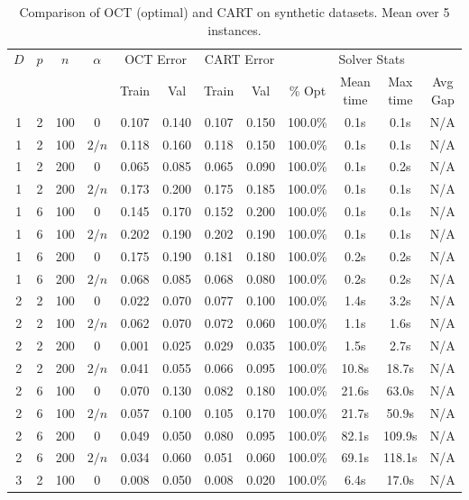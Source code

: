 \begin{table}[h]
\centering
\small
\caption{Comparison of OCT (optimal) and CART on synthetic datasets. Mean over 5 instances.}
\label{tab:results}
\begin{tabular}{cccc|cc|cc|cccc}
\hline
$D$ & $p$ & $n$ & $\alpha$ & \multicolumn{2}{c|}{OCT Error} & \multicolumn{2}{c|}{CART Error} & \multicolumn{4}{c}{Solver Stats} \\
    &     &     &          & Train & Val & Train & Val & \% Opt & Mean time & Max time & Avg Gap \\
\hline
1 & 2 & 100 & $0$ & 0.107 & 0.140 & 0.107 & 0.150 & 100.0\% & 0.1s & 0.1s & N/A \\
1 & 2 & 100 & $2/n$ & 0.118 & 0.160 & 0.118 & 0.150 & 100.0\% & 0.1s & 0.1s & N/A \\
1 & 2 & 200 & $0$ & 0.065 & 0.085 & 0.065 & 0.090 & 100.0\% & 0.1s & 0.2s & N/A \\
1 & 2 & 200 & $2/n$ & 0.173 & 0.200 & 0.175 & 0.185 & 100.0\% & 0.1s & 0.1s & N/A \\
1 & 6 & 100 & $0$ & 0.145 & 0.170 & 0.152 & 0.200 & 100.0\% & 0.1s & 0.1s & N/A \\
1 & 6 & 100 & $2/n$ & 0.202 & 0.190 & 0.202 & 0.190 & 100.0\% & 0.1s & 0.1s & N/A \\
1 & 6 & 200 & $0$ & 0.175 & 0.190 & 0.181 & 0.180 & 100.0\% & 0.2s & 0.2s & N/A \\
1 & 6 & 200 & $2/n$ & 0.068 & 0.085 & 0.068 & 0.080 & 100.0\% & 0.2s & 0.2s & N/A \\
2 & 2 & 100 & $0$ & 0.022 & 0.070 & 0.077 & 0.100 & 100.0\% & 1.4s & 3.2s & N/A \\
2 & 2 & 100 & $2/n$ & 0.062 & 0.070 & 0.072 & 0.060 & 100.0\% & 1.1s & 1.6s & N/A \\
2 & 2 & 200 & $0$ & 0.001 & 0.025 & 0.029 & 0.035 & 100.0\% & 1.5s & 2.7s & N/A \\
2 & 2 & 200 & $2/n$ & 0.041 & 0.055 & 0.066 & 0.095 & 100.0\% & 10.8s & 18.7s & N/A \\
2 & 6 & 100 & $0$ & 0.070 & 0.130 & 0.082 & 0.180 & 100.0\% & 21.6s & 63.0s & N/A \\
2 & 6 & 100 & $2/n$ & 0.057 & 0.100 & 0.105 & 0.170 & 100.0\% & 21.7s & 50.9s & N/A \\
2 & 6 & 200 & $0$ & 0.049 & 0.050 & 0.080 & 0.095 & 100.0\% & 82.1s & 109.9s & N/A \\
2 & 6 & 200 & $2/n$ & 0.034 & 0.060 & 0.051 & 0.060 & 100.0\% & 69.1s & 118.1s & N/A \\
3 & 2 & 100 & $0$ & 0.008 & 0.050 & 0.008 & 0.020 & 100.0\% & 6.4s & 17.0s & N/A \\

\end{tabular}
\end{table}
